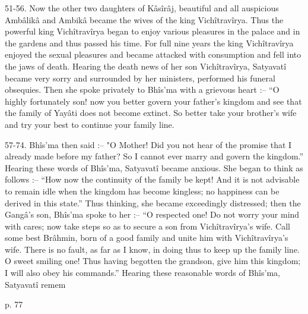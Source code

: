  

51-56. Now the other two daughters of Kâsîrâj, beautiful and all auspicious Ambâlikâ and Ambikâ became the wives of the king Vichîtravîrya. Thus the powerful king Vichîtravîrya began to enjoy various pleasures in the palace and in the gardens and thus passed his time. For full nine years the king Vichîtravîrya enjoyed the sexual pleasures and became attacked with consumption and fell into the jaws of death. Hearing the death news of her son Vichîtravîrya, Satyavatî became very sorry and surrounded by her ministers, performed his funeral obsequies. Then she spoke privately to Bhîs’ma with a grievous heart :-- “O highly fortunately son! now you better govern your father's kingdom and see that the family of Yayâti does not become extinct. So better take your brother's wife and try your best to continue your family line.

 

57-74. Bhîs’ma then said :-- "O Mother! Did you not hear of the promise that I already made before my father? So I cannot ever marry and govern the kingdom.” Hearing these words of Bhîs’ma, Satyavatî became anxious. She began to think as follows :-- “How now the continuity of the family be kept! And it is not advisable to remain idle when the kingdom has become kingless; no happiness can be derived in this state.” Thus thinking, she became exceedingly distressed; then the Gangâ's son, Bhîs’ma spoke to her :-- “O respected one! Do not worry your mind with cares; now take steps so as to secure a son from Vichîtravîrya's wife. Call some best Brâhmin, born of a good family and unite him with Vichîtravîrya's wife. There is no fault, as far as I know, in doing thus to keep up the family line. O sweet smiling one! Thus having begotten the grandson, give him this kingdom; I will also obey his commands.” Hearing these reasonable words of Bhîs’ma, Satyavatî remem

 

p. 77

 

